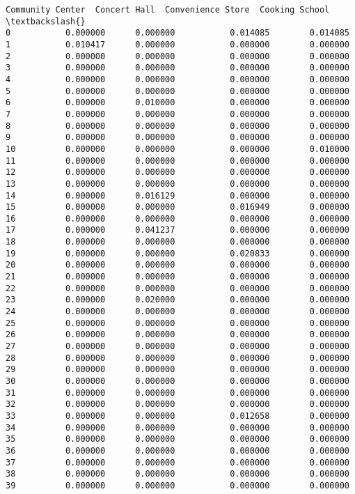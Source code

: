 \documentclass[11pt]{article}
\begin{document}
\begin{tcolorbox}[breakable, size=fbox, boxrule=.5pt, pad at break*=1mm, opacityfill=0]
\begin{Verbatim}[commandchars=\\\{\}]
    Community Center  Concert Hall  Convenience Store  Cooking School  \textbackslash{}
0           0.000000      0.000000           0.014085        0.014085
1           0.010417      0.000000           0.000000        0.000000
2           0.000000      0.000000           0.000000        0.000000
3           0.000000      0.000000           0.000000        0.000000
4           0.000000      0.000000           0.000000        0.000000
5           0.000000      0.000000           0.000000        0.000000
6           0.000000      0.010000           0.000000        0.000000
7           0.000000      0.000000           0.000000        0.000000
8           0.000000      0.000000           0.000000        0.000000
9           0.000000      0.000000           0.000000        0.000000
10          0.000000      0.000000           0.000000        0.010000
11          0.000000      0.000000           0.000000        0.000000
12          0.000000      0.000000           0.000000        0.000000
13          0.000000      0.000000           0.000000        0.000000
14          0.000000      0.016129           0.000000        0.000000
15          0.000000      0.000000           0.016949        0.000000
16          0.000000      0.000000           0.000000        0.000000
17          0.000000      0.041237           0.000000        0.000000
18          0.000000      0.000000           0.000000        0.000000
19          0.000000      0.000000           0.020833        0.000000
20          0.000000      0.000000           0.000000        0.000000
21          0.000000      0.000000           0.000000        0.000000
22          0.000000      0.000000           0.000000        0.000000
23          0.000000      0.020000           0.000000        0.000000
24          0.000000      0.000000           0.000000        0.000000
25          0.000000      0.000000           0.000000        0.000000
26          0.000000      0.000000           0.000000        0.000000
27          0.000000      0.000000           0.000000        0.000000
28          0.000000      0.000000           0.000000        0.000000
29          0.000000      0.000000           0.000000        0.000000
30          0.000000      0.000000           0.000000        0.000000
31          0.000000      0.000000           0.000000        0.000000
32          0.000000      0.000000           0.000000        0.000000
33          0.000000      0.000000           0.012658        0.000000
34          0.000000      0.000000           0.000000        0.000000
35          0.000000      0.000000           0.000000        0.000000
36          0.000000      0.000000           0.000000        0.000000
37          0.000000      0.000000           0.000000        0.000000
38          0.000000      0.000000           0.000000        0.000000
39          0.000000      0.000000           0.000000        0.000000


\end{Verbatim}
\end{tcolorbox}
\end{document}
